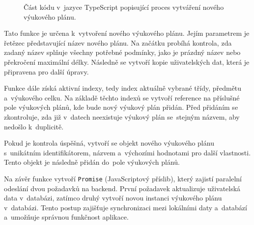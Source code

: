\documentclass[male,czech,api_bc]{kitheses}
\begin{document}
\begin{figure}[H]
	\centering
	\caption{Část kódu v~jazyce TypeScript popisující proces vytváření nového výukového plánu.}
	\label{fig:code-5}
\end{figure}

Tato funkce je určena k~vytvoření nového výukového plánu. Jejím parametrem je řetězec představující název nového plánu. Na začátku probíhá kontrola, zda zadaný název splňuje všechny potřebné podmínky, jako je prázdný název nebo překročení maximální délky. Následně se vytvoří kopie uživatelských dat, která je připravena pro další úpravy.

Funkce dále získá aktivní indexy, tedy index aktuálně vybrané třídy, předmětu a~výukového celku. Na základě těchto indexů se vytvoří reference na příslušné pole výukových plánů, kde bude nový výukový plán přidán. Před přidáním se zkontroluje, zda již v~datech neexistuje výukový plán se~stejným názvem, aby nedošlo k~duplicitě.

\newpage

Pokud je kontrola úspěšná, vytvoří se objekt nového výukového plánu s~unikátním identifikátorem, názvem a~výchozími hodnotami pro další vlastnosti. Tento objekt je následně přidán do~pole výukových plánů.

Na závěr funkce vytvoří \texttt{Promise} (JavaScriptový příslib), který zajistí paralelní odeslání dvou požadavků na backend. První požadavek aktualizuje uživatelská data v~databázi, zatímco druhý vytvoří novou instanci výukového plánu v~databázi. Tento postup zajišťuje synchronizaci mezi lokálními daty a~databází a~umožňuje správnou funkčnost aplikace.
\end{document}
